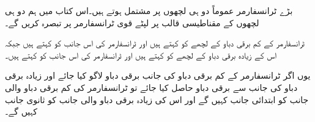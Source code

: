 بڑے ٹرانسفارمر عموماً دو ہی لچھوں پر مشتمل ہوتے ہیں۔اس کتاب میں ہم دو ہی لچھوں کے مقناطیسی قالب پر لپٹے قوی ٹرانسفارمر پر تبصرہ کریں گے۔

	ٹرانسفارمر کے کم برقی دباو کے لچھے کو   کہتے ہیں اور ٹرانسفارمر کی اس جانب کو   کہتے ہیں جبکہ اس کے زیادہ برقی دباو کے لچھے کو   کہتے ہیں اور ٹرانسفارمر کی اس جانب کو   کہتے ہیں۔

یوں اگر ٹرانسفارمر کے کم برقی دباو کی جانب برقی دباو لاگو کیا جائے اور زیادہ برقی دباو کی جانب سے برقی دباو حاصل کیا جائے تو ٹرانسفارمر کی کم برقی دباو والی جانب کو ابتدائی جانب کہیں گے اور اس کی زیادہ برقی دباو والی جانب کو ثانوی جانب کہیں گے۔


